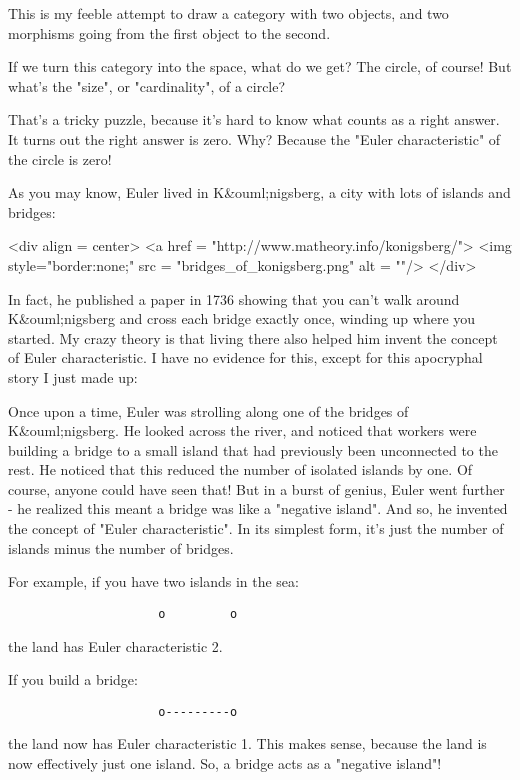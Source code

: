 This is my feeble attempt to draw a category with two objects, and two 
morphisms going from the first object to the second.

If we turn this category into the space, what do we get?  The circle,
of course!  But what's the "size", or
"cardinality", of a circle?

That's a tricky puzzle, because it's hard to know what counts as a
right answer.  It turns out the right answer is zero.  Why?  Because
the "Euler characteristic" of the circle is zero!

As you may know, Euler lived in K&ouml;nigsberg, a city with lots of
islands and bridges:

<div align = center>
<a href = "http://www.matheory.info/konigsberg/">
<img style="border:none;" src = "bridges_of_konigsberg.png" alt = ""/>
</div>

In fact, he published a paper in 1736 showing
that you can't walk around K&ouml;nigsberg and cross each bridge
exactly once, winding up where you started.  
My crazy theory is that
living there also helped him invent the concept of Euler
characteristic.  I have no evidence for this, except for this
apocryphal story I just made up:

Once upon a time, Euler was strolling along one of the bridges of
K&ouml;nigsberg.  He looked across the river, and noticed that workers
were building a bridge to a small island that had previously been
unconnected to the rest.  He noticed that this reduced the number of
isolated islands by one.  Of course, anyone could have seen that!
But in a burst of genius, Euler went further - he realized this meant
a bridge was like a "negative island".  And so, he invented
the concept of "Euler characteristic".  In its simplest
form, it's just the number of islands minus the number of bridges.

For example, if you have two islands in the sea:

\begin{verbatim}
                     o         o
\end{verbatim}
    
the land has Euler characteristic 2.

If you build a bridge:

\begin{verbatim}
                     o---------o
\end{verbatim}
    

the land now has Euler characteristic 1.  This makes sense, because
the land is now effectively just one island.  So, a bridge acts as a
"negative island"!

